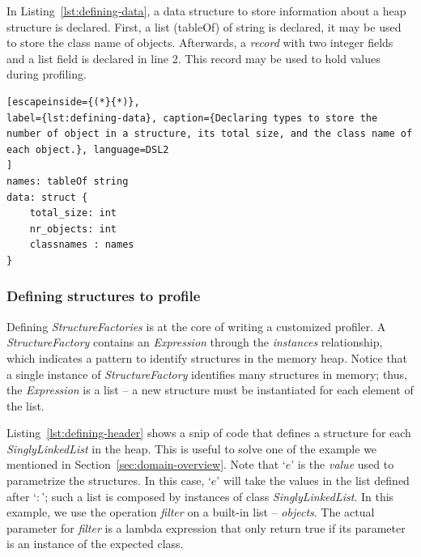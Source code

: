 In Listing~\ref{lst:defining-data}, a data structure to store information about a heap structure is declared.
First, a list (tableOf) of string is declared, it may be used to store the class name of objects.
Afterwards, a \textit{record} with two integer fields and a list field is declared in line 2.
This record may be used to hold values during profiling.

\begin{lstlisting}[escapeinside={(*}{*)}, 
label={lst:defining-data}, caption={Declaring types to store the number of object in a structure, its total size, and the class name of each object.}, language=DSL2
]
names: tableOf string
data: struct {
	total_size: int
	nr_objects: int
	classnames : names
}
\end{lstlisting}

\subsubsection*{Defining structures to profile}
Defining \textit{StructureFactories} is at the core of writing a customized profiler.
A \textit{StructureFactory} contains an \textit{Expression} through the \textit{instances} relationship, which indicates a pattern to identify structures in the memory heap.
Notice that a single instance of \textit{StructureFactory} identifies many structures in memory; thus, the \textit{Expression} is a list -- a new structure must be instantiated for each element of the list.


Listing~\ref{lst:defining-header} shows a snip of code that defines a structure for each \textit{SinglyLinkedList} in the heap.
This is useful to solve one of the example we mentioned in Section~\ref{sec:domain-overview}.
Note that `$e$' is the \textit{value} used to parametrize the structures.
In this case, `$e$' will take the values in the list defined after `$:$'; such a list is composed by instances of class \textit{SinglyLinkedList}.
In this example, we use the operation \textit{filter} on a built-in list -- \textit{objects}.
The actual parameter for \textit{filter} is a lambda expression that only return true if its parameter is an instance of the expected class. 

